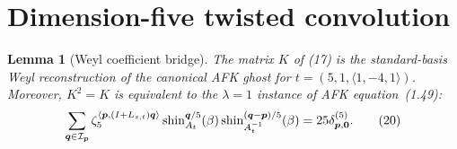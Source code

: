 \documentclass[11pt]{article}
\newtheorem{lemma}[theorem]{Lemma}
\begin{document}
\section{Dimension-five twisted convolution}

\begin{lemma}[Weyl coefficient bridge]\label{lem:bridge}
The matrix $K$ of (17) is the standard-basis Weyl reconstruction of
the canonical AFK ghost for
$t=(5,1,\langle1,-4,1\rangle)$.  Moreover, $K^2=K$ is equivalent to
the $\lambda=1$ instance of AFK equation~(1.49):
\[
\sum_{\boldsymbol q\in{\cal I}_{\boldsymbol p}}
\zeta_5^{\langle\boldsymbol p,(I+L_{z,t})\boldsymbol q\rangle}
\operatorname{shin}_{A_t}^{\boldsymbol q/5}(\beta)
\operatorname{shin}_{A_t^{-1}}^{(\boldsymbol q-\boldsymbol p)/5}(\beta)
=25\delta_{\boldsymbol p,\boldsymbol0}^{(5)}.
\tag{20}
\]
\end{lemma}
\end{document}
